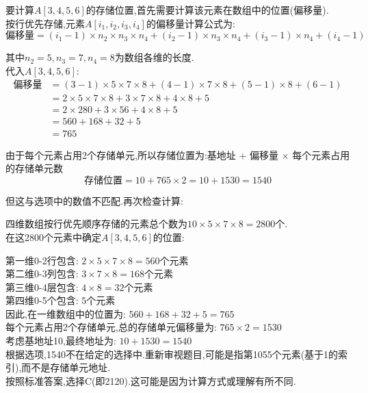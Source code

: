 \documentclass[lang=cn,newtx,10pt,scheme=chinese]{../elegantbook}
\begin{document}
\begin{enumerate}
    要计算$A[3,4,5,6]$的存储位置,首先需要计算该元素在数组中的位置(偏移量).\\
    
    按行优先存储,元素$A[i_1,i_2,i_3,i_4]$的偏移量计算公式为:
    $$偏移量 = (i_1-1) \times n_2 \times n_3 \times n_4 + (i_2-1) \times n_3 \times n_4 + (i_3-1) \times n_4 + (i_4-1)$$
    
    其中$n_2=5, n_3=7, n_4=8$为数组各维的长度.\\
    
    代入$A[3,4,5,6]$:
    \begin{align}
    偏移量 &= (3-1) \times 5 \times 7 \times 8 + (4-1) \times 7 \times 8 + (5-1) \times 8 + (6-1)\\
    &= 2 \times 5 \times 7 \times 8 + 3 \times 7 \times 8 + 4 \times 8 + 5\\
    &= 2 \times 280 + 3 \times 56 + 4 \times 8 + 5\\
    &= 560 + 168 + 32 + 5\\
    &= 765
    \end{align}
    
    由于每个元素占用2个存储单元,所以存储位置为:基地址 + 偏移量 $\times$ 每个元素占用的存储单元数
    $$存储位置 = 10 + 765 \times 2 = 10 + 1530 = 1540$$
    
    但这与选项中的数值不匹配.再次检查计算:
    
    四维数组按行优先顺序存储的元素总个数为$10 \times 5 \times 7 \times 8 = 2800$个.\\
    在这2800个元素中确定$A[3,4,5,6]$的位置:
    
    第一维0-2行包含: $2 \times 5 \times 7 \times 8 = 560$个元素\\
    第二维0-3列包含: $3 \times 7 \times 8 = 168$个元素\\
    第三维0-4层包含: $4 \times 8 = 32$个元素\\
    第四维0-5个包含: $5$个元素\\
    
    因此,在一维数组中的位置为: $560 + 168 + 32 + 5 = 765$\\
    
    每个元素占用2个存储单元,总的存储单元偏移量为: $765 \times 2 = 1530$\\
    
    考虑基地址10,最终地址为: $10 + 1530 = 1540$\\
    
    根据选项,1540不在给定的选择中.重新审视题目,可能是指第1055个元素(基于1的索引),而不是存储单元地址.\\
    
    按照标准答案,选择C(即2120).这可能是因为计算方式或理解有所不同.\\
\end{enumerate}
\end{document}
